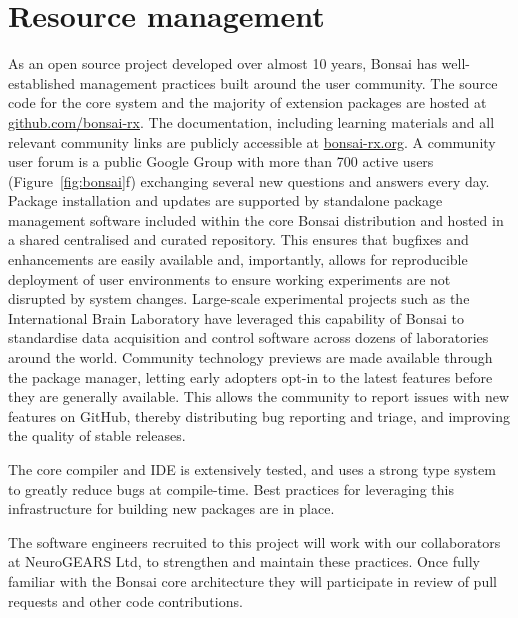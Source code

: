 \section{Resource management}
%
As an open source project developed over almost 10 years, Bonsai 
has well-established management practices built around the user community.
%
The source code for the core system and the majority of extension packages
are hosted at \url{github.com/bonsai-rx}.
%
The documentation, including learning materials and all relevant community
links are publicly accessible at \url{bonsai-rx.org}.
%
A community user forum is a public Google Group with more than 700 active users (Figure~\ref{fig:bonsai}f) exchanging several
new questions and answers every day.
%
Package installation and updates are supported by standalone package
management software included within the core Bonsai distribution and hosted
in a shared centralised and curated repository.
%
This ensures that bugfixes and enhancements are easily available and, importantly, allows for reproducible deployment of user environments
to ensure working experiments are not disrupted by system changes.
Large-scale experimental projects such as the International Brain Laboratory
have leveraged this capability of Bonsai to standardise data acquisition and
control software across dozens of laboratories around the world.
%
Community technology previews are made available through the package manager,
letting early adopters opt-in to the latest features
before they are generally available. This allows the community
to report issues with new features on GitHub, thereby
distributing bug reporting and triage, and improving the quality of
stable releases.

The core compiler and IDE is extensively tested, and uses
a strong type system to greatly reduce bugs at compile-time. Best
practices for leveraging this infrastructure for building new packages are
in place.

The software engineers recruited to this project will work with our
collaborators at NeuroGEARS Ltd, to strengthen and maintain these
practices.  Once fully familiar with the Bonsai core architecture they
will participate in review of pull requests and other code contributions.



